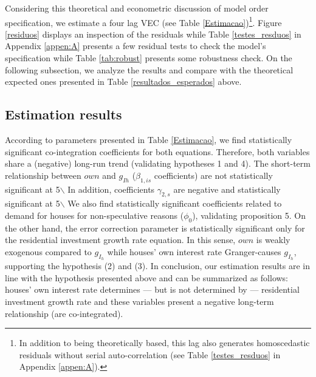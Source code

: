 \documentclass[11pt]{article}
\begin{document}
Considering this theoretical and econometric discussion of model order specification, we estimate a four lag VEC  (see Table \ref{Estimacao})\footnote{In addition to being theoretically based, this lag also generates homoscedastic residuals without serial auto-correlation (see Table \ref{testes_resduos} in Appendix \ref{appen:A}).}. 
Figure \ref{residuos} displays an inspection of the residuals while Table \ref{testes_resduos} in Appendix \ref{appen:A} presents a few residual tests to check the model's specification while Table \ref{tab:robust} presents some robustness check.
On the following subsection, we analyze the results and compare with the theoretical expected ones presented in Table \ref{resultados_esperados} above.  




\subsection{Estimation results}
\label{sec:org647fd9b}
\label{sec:results}

According to parameters presented in Table \ref{Estimacao}, we find statistically significant co-integration  coefficients for both equations. 
Therefore, both variables share a (negative) long-run trend (validating hypotheses 1 and 4).
The short-term relationship between \(own\) and \(g_{Ih}\) (\(\beta_{1, is}\) coefficients) are not statistically significant at 5$\backslash$%
In addition, coefficients \(\gamma_{2,s}\) are negative and statistically significant at 5$\backslash$%
We also find statistically significant coefficients related to demand for houses for non-speculative reasons (\(\phi_0\)), validating proposition 5.
On the other hand, the error correction parameter is statistically significant only for the residential investment growth rate equation.
In this sense, \(own\) is weakly exogenous compared to \(g_{I_h}\) while houses' own interest rate Granger-causes \(g_{I_h}\), supporting the hypothesis (2) and (3).
In conclusion, our estimation results are in line with the hypothesis presented above and can be summarized as follows: houses' own interest rate determines --- but is not determined by --- residential investment growth rate and these variables present a negative long-term relationship (are co-integrated).
\end{document}
